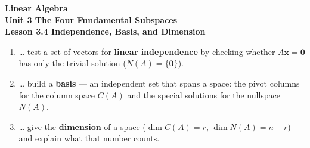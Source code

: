 \documentclass[10pt]{article}
\begin{document}
\vspace{-0.8in}

\begin{center}
  {\color{white}\textbf{\LARGE Linear Algebra}}\\[4pt]
  {\color{blushmid}\large\textbf{Unit 3 \quad The Four Fundamental Subspaces}}\\[6pt]
  {\color{white}\textbf{\large Lesson 3.4 \quad Independence, Basis, and Dimension}}
\end{center}

\vspace{0.22in}
\namedateperiod
\vspace{0.18in}

\begin{learningtargetbox}
\small
\begin{enumerate}[leftmargin=1.5em, itemsep=5pt]
  \item \ldots{} test a set of vectors for \textbf{linear independence} by checking whether $A\mathbf{x}=\mathbf{0}$ has only the trivial solution ($N(A)=\{\mathbf{0}\}$).
  \item \ldots{} build a \textbf{basis} --- an independent set that spans a space: the pivot columns for the column space $C(A)$ and the special solutions for the nullspace $N(A)$.
  \item \ldots{} give the \textbf{dimension} of a space ($\dim C(A)=r$, $\dim N(A)=n-r$) and explain what that number counts.
\end{enumerate}
\end{learningtargetbox}

\vspace{0.14in}
\end{document}
